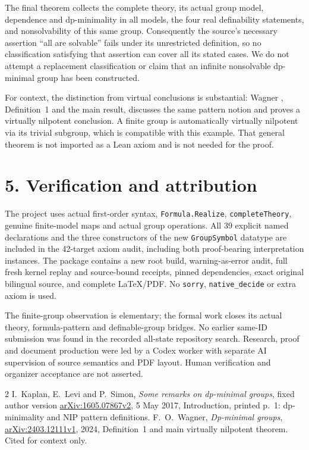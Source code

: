 \documentclass[10pt]{article}
\begin{document}
The final theorem collects the complete theory, its actual group model, dependence and dp-minimality in all models, the four real definability statements, and nonsolvability of this same group. Consequently the source's necessary assertion ``all are solvable'' fails under its unrestricted definition, so no classification satisfying that assertion can cover all its stated cases. We do not attempt a replacement classification or claim that an infinite nonsolvable dp-minimal group has been constructed.

For context, the distinction from virtual conclusions is substantial: Wagner \cite{W}, Definition~1 and the main result, discusses the same pattern notion and proves a virtually nilpotent conclusion. A finite group is automatically virtually nilpotent via its trivial subgroup, which is compatible with this example. That general theorem is not imported as a Lean axiom and is not needed for the proof.

\section*{5. Verification and attribution}
The project uses actual first-order syntax, \texttt{Formula.Realize}, \texttt{completeTheory}, genuine finite-model maps and actual group operations. All 39 explicit named declarations and the three constructors of the new \texttt{GroupSymbol} datatype are included in the 42-target axiom audit, including both proof-bearing interpretation instances. The package contains a new root build, warning-as-error audit, full fresh kernel replay and source-bound receipts, pinned dependencies, exact original bilingual source, and complete LaTeX/PDF. No \texttt{sorry}, \texttt{native\_decide} or extra axiom is used.

The finite-group observation is elementary; the formal work closes its actual theory, formula-pattern and definable-group bridges. No earlier same-ID submission was found in the recorded all-state repository search. Research, proof and document production were led by a Codex worker with separate AI supervision of source semantics and PDF layout. Human verification and organizer acceptance are not asserted.

\begin{thebibliography}{2}
 I.~Kaplan, E.~Levi and P.~Simon, \emph{Some remarks on dp-minimal groups}, fixed author version \href{https://arxiv.org/pdf/1605.07867v2}{arXiv:1605.07867v2}, 5 May 2017, Introduction, printed p.~1: dp-minimality and NIP pattern definitions.
 F.~O.~Wagner, \emph{Dp-minimal groups}, \href{https://arxiv.org/pdf/2403.12111v1}{arXiv:2403.12111v1}, 2024, Definition~1 and main virtually nilpotent theorem. Cited for context only.
\end{thebibliography}
\end{document}
